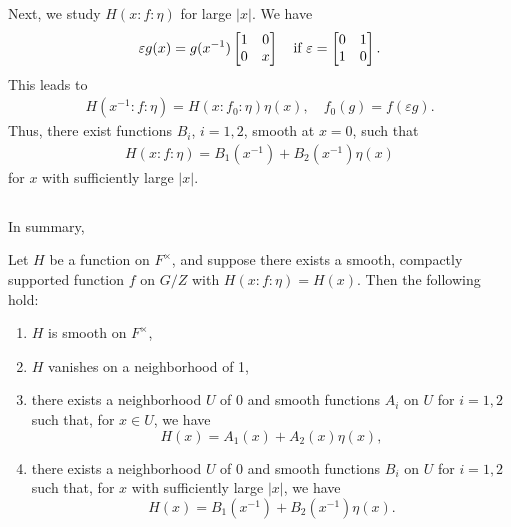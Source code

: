 Next, we study $H(x:f:\eta)$ for large $|x|$.
We have
\begin{align*}
    \varepsilon g(x) = g(x^{-1}) \begin{bmatrix} 1 & 0 \\ 0 & x \end{bmatrix}\quad \text{if } \varepsilon = \begin{bmatrix} 0 & 1 \\ 1 & 0 \end{bmatrix}.
\end{align*}
This leads to
\begin{align}
    H(x^{-1}: f: \eta) = H(x:f_0:\eta)\eta(x), \quad f_0(g) = f(\varepsilon g).
\end{align}
Thus, there exist functions $B_i$, $i = 1, 2$, smooth at $x = 0$, such that
\begin{align}
    H(x:f:\eta) = B_1(x^{-1}) + B_2(x^{-1})\eta(x)
\end{align}
for $x$ with sufficiently large $|x|$.

\subsection{}
In summary,
\begin{proposition}\label{prop:3.1}
Let $H$ be a function on $F^\times$, and suppose there exists a smooth, compactly supported function $f$ on $G/Z$ with $H(x:f:\eta) = H(x)$.
Then the following hold:
\begin{enumerate}
    \item $H$ is smooth on $F^\times$,
    \item $H$ vanishes on a neighborhood of 1,
    \item there exists a neighborhood $U$ of 0 and smooth functions $A_i$ on $U$ for $i = 1, 2$ such that, for $x \in U$, we have
    \[
    H(x) = A_1(x) + A_2(x) \eta(x),
    \]
    \item there exists a neighborhood $U$ of 0 and smooth functions $B_i$ on $U$ for $i = 1, 2$ such that, for $x$ with sufficiently large $|x|$, we have
    \[
    H(x) = B_1(x^{-1}) + B_{2}(x^{-1}) \eta(x).
    \]
\end{enumerate}
\end{proposition}


